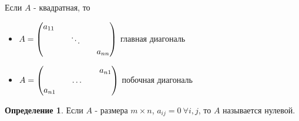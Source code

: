\documentclass[a4paper, 12pt]{article}
\theoremstyle{definition}
\newtheorem*{definition}{Определение}
\begin{document}
    \newpage
    Если $A$ - квадратная, то
    \begin{itemize}
      \item $ A =\begin{pmatrix}
        a_{11} && \null && \null \\
        \null && \ddots && \null \\
        \null && \null && a_{nn} 
      \end{pmatrix} $ главная диагональ
      \item $ A =
      \begin{pmatrix}
        \null && \null && a_{n1} \\
        \null && \dots && \null \\
        a_{n1}  && \null && \null
      \end{pmatrix} $ побочная диагональ
    \end{itemize}
    
    \begin{definition}
      Если $A$ - размера $m\times n$, $a_{ij} = 0\ \forall i,j$, то $A$ называется нулевой.
    \end{definition}
\end{document}
